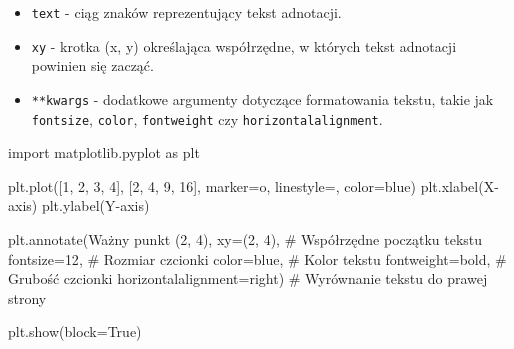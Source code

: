 \documentclass[
  polish,
  letterpaper,
  DIV=11,
  numbers=noendperiod]{scrreprt}
\newenvironment{Shaded}{\begin{snugshade}}{\end{snugshade}}
\newcommand{\CommentTok}[1]{\textcolor[rgb]{0.37,0.37,0.37}{#1}}
\newcommand{\DecValTok}[1]{\textcolor[rgb]{0.68,0.00,0.00}{#1}}
\newcommand{\ImportTok}[1]{\textcolor[rgb]{0.00,0.46,0.62}{#1}}
\newcommand{\NormalTok}[1]{\textcolor[rgb]{0.00,0.23,0.31}{#1}}
\newcommand{\OperatorTok}[1]{\textcolor[rgb]{0.37,0.37,0.37}{#1}}
\newcommand{\StringTok}[1]{\textcolor[rgb]{0.13,0.47,0.30}{#1}}
\newcommand{\VariableTok}[1]{\textcolor[rgb]{0.07,0.07,0.07}{#1}}
\providecommand{\tightlist}{%
  \setlength{\itemsep}{0pt}\setlength{\parskip}{0pt}}
\begin{document}
\begin{itemize}
\tightlist
\item
  \texttt{text} - ciąg znaków reprezentujący tekst adnotacji.
\item
  \texttt{xy} - krotka (x, y) określająca współrzędne, w których tekst
  adnotacji powinien się zacząć.
\item
  \texttt{**kwargs} - dodatkowe argumenty dotyczące formatowania tekstu,
  takie jak \texttt{fontsize}, \texttt{color}, \texttt{fontweight} czy
  \texttt{horizontalalignment}.
\end{itemize}

\begin{Shaded}
\begin{Highlighting}[]
\ImportTok{import}\NormalTok{ matplotlib.pyplot }\ImportTok{as}\NormalTok{ plt}

\NormalTok{plt.plot([}\DecValTok{1}\NormalTok{, }\DecValTok{2}\NormalTok{, }\DecValTok{3}\NormalTok{, }\DecValTok{4}\NormalTok{], [}\DecValTok{2}\NormalTok{, }\DecValTok{4}\NormalTok{, }\DecValTok{9}\NormalTok{, }\DecValTok{16}\NormalTok{], marker}\OperatorTok{=}\StringTok{\textquotesingle{}o\textquotesingle{}}\NormalTok{, linestyle}\OperatorTok{=}\StringTok{\textquotesingle{}{-}\textquotesingle{}}\NormalTok{, color}\OperatorTok{=}\StringTok{\textquotesingle{}blue\textquotesingle{}}\NormalTok{)}
\NormalTok{plt.xlabel(}\StringTok{\textquotesingle{}X{-}axis\textquotesingle{}}\NormalTok{)}
\NormalTok{plt.ylabel(}\StringTok{\textquotesingle{}Y{-}axis\textquotesingle{}}\NormalTok{)}

\NormalTok{plt.annotate(}\StringTok{\textquotesingle{}Ważny punkt (2, 4)\textquotesingle{}}\NormalTok{,}
\NormalTok{             xy}\OperatorTok{=}\NormalTok{(}\DecValTok{2}\NormalTok{, }\DecValTok{4}\NormalTok{),                           }\CommentTok{\# Współrzędne początku tekstu}
\NormalTok{             fontsize}\OperatorTok{=}\DecValTok{12}\NormalTok{,                         }\CommentTok{\# Rozmiar czcionki}
\NormalTok{             color}\OperatorTok{=}\StringTok{\textquotesingle{}blue\textquotesingle{}}\NormalTok{,                        }\CommentTok{\# Kolor tekstu}
\NormalTok{             fontweight}\OperatorTok{=}\StringTok{\textquotesingle{}bold\textquotesingle{}}\NormalTok{,                   }\CommentTok{\# Grubość czcionki}
\NormalTok{             horizontalalignment}\OperatorTok{=}\StringTok{\textquotesingle{}right\textquotesingle{}}\NormalTok{)         }\CommentTok{\# Wyrównanie tekstu do prawej strony}

\NormalTok{plt.show(block}\OperatorTok{=}\VariableTok{True}\NormalTok{)}
\end{Highlighting}
\end{Shaded}
\end{document}
